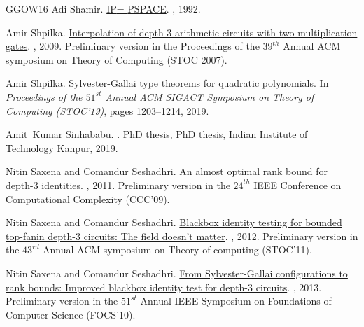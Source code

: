 \documentclass[10pt,a4paper]{article}
\numberwithin{equation}{section}
\begin{document}
\begin{thebibliography}{GGOW16}
Adi Shamir.
\newblock \href{https://dl.acm.org/doi/10.1145/146585.146609}{{IP}= {PSPACE}}.
, 1992.

Amir Shpilka.
\newblock \href{https://epubs.siam.org/doi/abs/10.1137/070694879}{Interpolation
  of depth-3 arithmetic circuits with two multiplication gates}.
, 2009.
\newblock Preliminary version in the Proceedings of the $39^{th}$ Annual ACM
  symposium on Theory of Computing (STOC 2007).

Amir Shpilka.
\newblock
  \href{https://dl.acm.org/doi/10.1145/3313276.3316341}{Sylvester-Gallai type
  theorems for quadratic polynomials}.
\newblock In {\em Proceedings of the $51^{st}$ Annual ACM SIGACT Symposium on
  Theory of Computing (STOC'19)}, pages 1203--1214, 2019.

Amit~Kumar Sinhababu.
.
\newblock PhD thesis, PhD thesis, Indian Institute of Technology Kanpur, 2019.

Nitin Saxena and Comandur Seshadhri.
\newblock \href{https://dl.acm.org/doi/10.1137/090770679}{An almost optimal
  rank bound for depth-3 identities}.
, 2011.
\newblock Preliminary version in the $24^{th}$ IEEE Conference on Computational
  Complexity (CCC'09).

Nitin Saxena and Comandur Seshadhri.
\newblock \href{https://epubs.siam.org/doi/abs/10.1137/10848232}{Blackbox
  identity testing for bounded top-fanin depth-3 circuits: The field doesn't
  matter}.
, 2012.
\newblock Preliminary version in the $43^{rd}$ Annual ACM symposium on Theory
  of computing (STOC'11).

Nitin Saxena and Comandur Seshadhri.
\newblock \href{https://dl.acm.org/doi/10.1145/2528403}{From Sylvester-Gallai
  configurations to rank bounds: Improved blackbox identity test for depth-3
  circuits}.
, 2013.
\newblock Preliminary version in the $51^{st}$ Annual IEEE Symposium on
  Foundations of Computer Science (FOCS'10).


\end{thebibliography}
\end{document}
